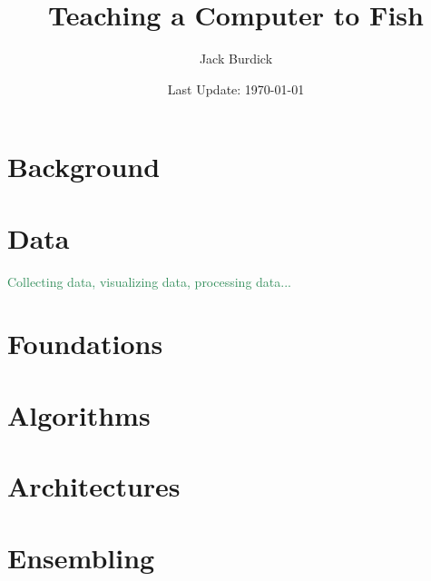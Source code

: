 \documentclass[12pt]{book}
\title{Teaching a Computer to Fish}
\author{Jack Burdick}
\date{Last Update: \today} %
\def\r#1{\textcolor{SeaGreen}{#1}}
\begin{document}
 
	
\frontmatter

\maketitle 

\tableofcontents

\mainmatter

\part{Background}







\part{Data}
\r{Collecting data, visualizing data, processing data...}



\part{Foundations}



\part{Algorithms}


\part{Architectures}











\part{Ensembling}
\end{document}
